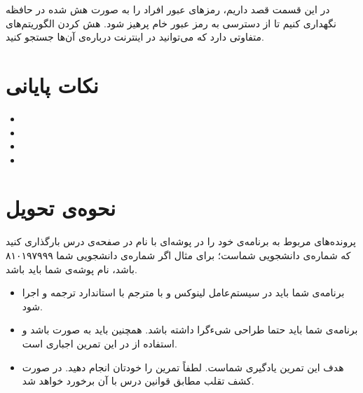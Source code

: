 \documentclass{utap}
\begin{document}
		در این قسمت قصد داریم، رمز‌های عبور افراد را به صورت هش شده در حافظه نگهداری کنیم تا از دسترسی به رمز عبور خام پرهیز شود. هش کردن الگوریتم‌های متفاوتی دارد که می‌توانید در اینترنت درباره‌ی آن‌ها جستجو کنید.

	\section{نکات پایانی}
		\begin{itemize}
			\item
			\item
			\item
			\item
		\end{itemize}

	\section{نحوه‌ی تحویل}
		پرونده‌‌های مربوط به برنامه‌ی خود را در پوشه‌ای با نام  در صفحه‌ی  درس بارگذاری کنید که  شماره‌ی دانشجویی شماست؛ برای مثال اگر شماره‌ی دانشجویی شما ۸۱۰۱۹۷۹۹۹ باشد، نام پوشه‌ی شما باید  باشد.
		\begin{itemize}
			\item
						برنامه‌ی شما باید در سیستم‌عامل لینوکس و با مترجم  با استاندارد  ترجمه و اجرا شود.
					\item
						برنامه‌ی شما باید حتما طراحی شیءگرا داشته باشد. همچنین باید به صورت  باشد و استفاده از  در این تمرین اجباری است.
					\item
						هدف این تمرین یادگیری شماست. لطفاً تمرین را خودتان انجام دهید. در صورت کشف تقلب مطابق قوانین درس با آن برخورد خواهد شد.
		\end{itemize}
\end{document}
